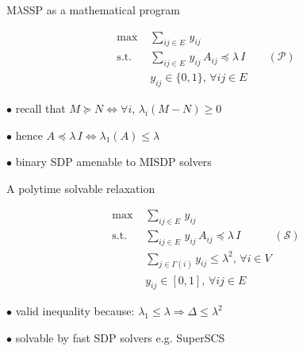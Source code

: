 \documentclass[14pt]{beamer}
\begin{document}
\begin{frame}{M$\lambda$SSP as a mathematical program}
\begin{fullpageitemize}
\item \begin{align*}
\max \, & \, \sum_{ij \in E} \, y_{ij} \\
\text{s.t.} \, & \, \sum_{ij \in E} \, y_{ij} \, A_{ij} \preceq \lambda \, I \quad\quad (\mathcal{P}) \\
& \, y_{ij} \in \{0,1\},\, \forall ij \in E
\end{align*}
\end{fullpageitemize}
\begin{fullpageitemize}
\item $\bullet$ recall that $M \succeq N \iff \forall i,\, \lambda_i(M - N) \geq 0$
\item $\bullet$ hence $A \preceq \lambda \, I \iff \lambda_1(A) \leq \lambda$
\item $\bullet$ binary SDP amenable to MISDP solvers
\end{fullpageitemize}
\end{frame}

\begin{frame}{A polytime solvable relaxation}
\begin{fullpageitemize}
\item \begin{align*}
\max \, & \, \sum_{ij \in E} \, y_{ij} \\
\text{s.t.} \, & \, \sum_{ij \in E} \, y_{ij} \, A_{ij} \preceq \lambda \, I \quad\quad\quad (\mathcal{S}) \\
& \, \sum_{j \in \Gamma(i)} y_{ij} \leq \lambda^2,\, \forall i \in V \\
& \, y_{ij} \in [0,1],\, \forall ij \in E
\end{align*}
\end{fullpageitemize}
\begin{fullpageitemize}
\item $\bullet$ valid inequality because: $\lambda_1 \leq \lambda \Rightarrow \Delta \leq \lambda^2$
\item $\bullet$ solvable by fast SDP solvers e.g. SuperSCS
\end{fullpageitemize}
\end{frame}
\end{document}
